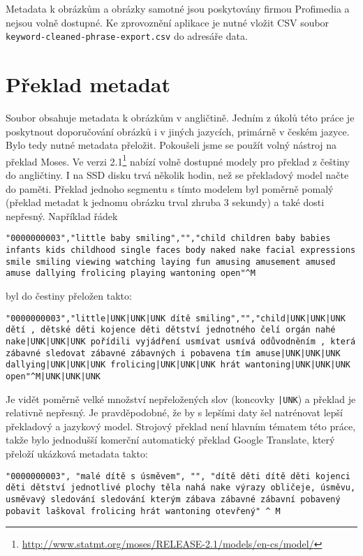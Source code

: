 Metadata k obrázkům a obrázky samotné jsou poskytovány firmou Profimedia a nejsou volně dostupné. Ke zprovoznění aplikace je nutné vložit CSV soubor \lstinline{keyword-cleaned-phrase-export.csv} do adresáře data.

\section{Překlad metadat}
Soubor obsahuje metadata k obrázkům v angličtině. Jedním z úkolů této práce je poskytnout doporučování obrázků i v jiných jazycích, primárně v českém jazyce. Bylo tedy nutné metadata přeložit. Pokoušeli jsme se použít volný nástroj na překlad Moses. Ve verzi 2.1\footnote{\url{http://www.statmt.org/moses/RELEASE-2.1/models/en-cs/model/}} nabízí volně dostupné modely pro překlad z češtiny do angličtiny. I na SSD disku trvá několik hodin, než se překladový model načte do paměti. Překlad jednoho segmentu s tímto modelem byl poměrně pomalý (překlad metadat k jednomu obrázku trval zhruba 3 sekundy) a také dosti nepřesný. Například řádek

\begin{lstlisting}
"0000000003","little baby smiling","","child children baby babies infants kids childhood single faces body naked nake facial expressions smile smiling viewing watching laying fun amusing amusement amused amuse dallying frolicing playing wantoning open"^M
\end{lstlisting}

byl do čestiny přeložen takto:

\begin{lstlisting}
"0000000003","little|UNK|UNK|UNK dítě smiling","","child|UNK|UNK|UNK dětí , dětské děti kojence děti dětství jednotného čelí orgán nahé nake|UNK|UNK|UNK pořídili vyjádření usmívat usmívá odůvodněním , která zábavné sledovat zábavné zábavných i pobavena tím amuse|UNK|UNK|UNK dallying|UNK|UNK|UNK frolicing|UNK|UNK|UNK hrát wantoning|UNK|UNK|UNK open"^M|UNK|UNK|UNK
\end{lstlisting}

Je vidět poměrně velké množství nepřeložených slov (koncovky \lstinline{|UNK}) a překlad je relativně nepřesný. Je pravděpodobné, že by s lepšími daty šel natrénovat lepší překladový a jazykový model. Strojový překlad není hlavním tématem této práce, takže bylo jednodušší komerční automatický překlad Google Translate, který přeloží ukázková metadata takto:

\begin{lstlisting}
"0000000003", "malé dítě s úsměvem", "", "dítě děti dítě děti kojenci děti dětství jednotlivé plochy těla nahá nake výrazy obličeje, úsměvu, usměvavý sledování sledování kterým zábava zábavné zábavní pobavený pobavit laškoval frolicing hrát wantoning otevřený" ^ M
\end{lstlisting}

